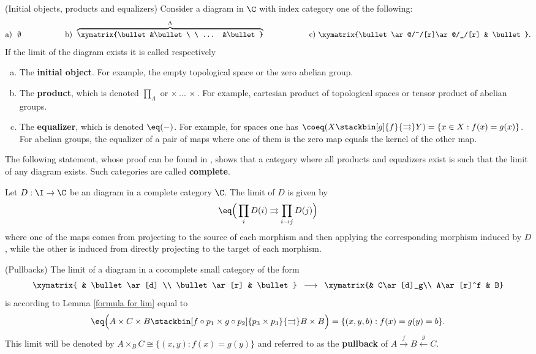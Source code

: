 \documentclass[main.tex]{subfiles}
\begin{document}
\begin{aex}(Initial objects, products and equalizers) \label{products and equalizers}
Consider a diagram in $\C$ with index category one of the following:
$$\text{a)} \ \ \emptyset \hspace*{2cm} \text{b)}\ \stackrel{\Lambda}{\overbrace{\xymatrix{\bullet &\bullet \ \ ... &\bullet}}} \hspace*{2cm} \text{c)}\ \xymatrix{\bullet\ar@/^/[r]\ar@/_/[r] & \bullet}.$$
If the limit of the diagram exists it is called respectively
\begin{enumerate}[a)]
\item The \textbf{initial object}. For example, the empty topological space or the zero abelian group.
\item The \textbf{product}, which is denoted $\prod_\Lambda$ or $\times\, ...\,\times$. For example, cartesian product of topological spaces or tensor product of abelian groups.
\item The \textbf{equalizer}, which is denoted $\eq(-)$. For example, for spaces one has $\coeq(X\stackbin[g]{f}{\rightrightarrows}Y)=\{x\in X:f(x)=g(x)\}$. For abelian groups, the equalizer of a pair of maps where one of them is the zero map equals the kernel of the other map.
\end{enumerate}
\end{aex}

The following statement, whose proof can be found in \cite[p.112]{MaL98}, shows that a category where all products and equalizers exist is such that the limit of any diagram exists. Such categories are called \textbf{complete}.

\begin{alemma}\label{formula for lim}
Let $D:\I\to\C$ be an diagram in a complete category $\C$. The limit of $D$ is given by $$\eq\Big(\prod_{i}D(i)\rightrightarrows\prod_{i\to j}D(j)\Big)$$
where one of the maps comes from projecting to the source of each morphism and then applying the corresponding morphism induced by $D$, while the other is induced from directly projecting to the target of each morphism.
\end{alemma}

\begin{aex}(Pullbacks)
The limit of a diagram in a cocomplete small category of the form \vspace*{-10pt}
$$\begin{array}{l}
\xymatrix{ & \bullet\ar[d] \\ \bullet\ar[r] & \bullet}
\end{array}\longrightarrow\begin{array}{l}
\xymatrix{& C\ar[d]_g\\ A\ar[r]^f & B}
\end{array}$$
is according to Lemma \ref{formula for lim} equal to $$\eq\Big(A\times C\times B\stackbin[f\circ p_1\times g\circ p_2]{p_3\times p_3}{\rightrightarrows}B\times B \Big)=\{(x,y,b):f(x)=g(y)=b\}.$$
This limit will be denoted by $A\times_B C\cong\{(x,y):f(x)=g(y)\}$ and referred to as the \textbf{pullback} of $A\stackrel{f}{\to}B\stackrel{g}{\leftarrow}C$.
\end{aex}
\end{document}
